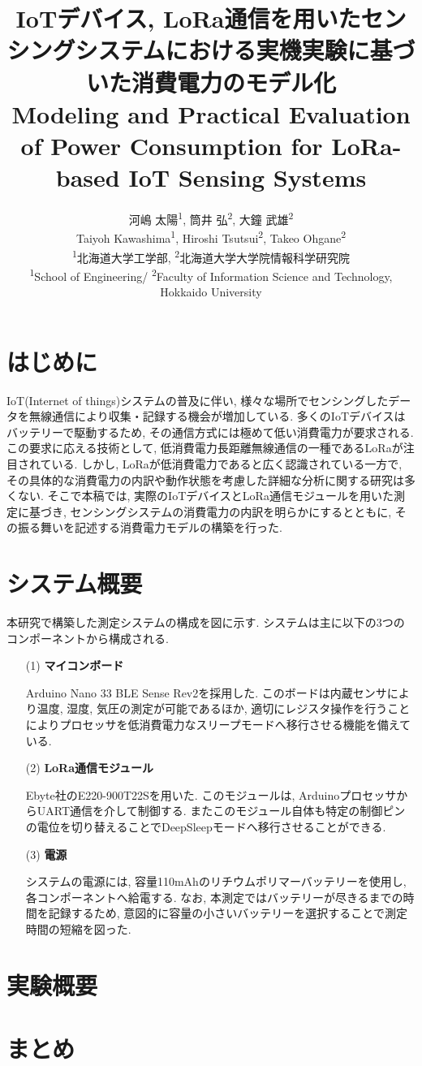 \documentclass[lualatex, twocolumn]{ltjsarticle}
\title{{\bfseries IoTデバイス, LoRa通信を用いたセンシングシステムにおける実機実験に基づいた消費電力のモデル化}\\
\large{Modeling and Practical Evaluation of Power Consumption for LoRa-based IoT Sensing Systems}}
\author{
    河嶋 太陽\textsuperscript{1},
    筒井 弘\textsuperscript{2},
    大鐘 武雄\textsuperscript{2}
    \\
    \normalsize
    Taiyoh Kawashima\textsuperscript{1},
    Hiroshi Tsutsui\textsuperscript{2},
    Takeo Ohgane\textsuperscript{2}
    \\
    \textsuperscript{1}北海道大学工学部,
    \textsuperscript{2}北海道大学大学院情報科学研究院
    \\
    \normalsize
    \textsuperscript{1}School of Engineering/ \textsuperscript{2}Faculty of Information Science and Technology, Hokkaido University
}
\date{}
\begin{document}
\maketitle

\section{はじめに}
 IoT(Internet of things)システムの普及に伴い, 様々な場所でセンシングしたデータを無線通信により収集・記録する機会が増加している. 
多くのIoTデバイスはバッテリーで駆動するため, その通信方式には極めて低い消費電力が要求される. 
この要求に応える技術として,  低消費電力長距離無線通信の一種であるLoRaが注目されている. 
しかし, LoRaが低消費電力であると広く認識されている一方で, その具体的な消費電力の内訳や動作状態を考慮した詳細な分析に関する研究は多くない. 
そこで本稿では,  実際のIoTデバイスとLoRa通信モジュールを用いた測定に基づき, センシングシステムの消費電力の内訳を明らかにするとともに, その振る舞いを記述する消費電力モデルの構築を行った. 

\section{システム概要}
 本研究で構築した測定システムの構成を図に示す. システムは主に以下の3つのコンポーネントから構成される.
\begin{enumerate}
    \item[(1)]\textbf{マイコンボード}

    Arduino Nano 33 BLE Sense Rev2を採用した. このボードは内蔵センサにより温度, 湿度, 気圧の測定が可能であるほか, 
    適切にレジスタ操作を行うことによりプロセッサを低消費電力なスリープモードへ移行させる機能を備えている.

    \item[(2)]\textbf{LoRa通信モジュール}

    Ebyte社のE220-900T22Sを用いた. このモジュールは, ArduinoプロセッサからUART通信を介して制御する. 
    またこのモジュール自体も特定の制御ピンの電位を切り替えることでDeepSleepモードへ移行させることができる. 

    \item[(3)]\textbf{電源}

    システムの電源には, 容量110mAhのリチウムポリマーバッテリーを使用し, 各コンポーネントへ給電する.
    なお, 本測定ではバッテリーが尽きるまでの時間を記録するため, 意図的に容量の小さいバッテリーを選択することで測定時間の短縮を図った.
\end{enumerate}

\section{実験概要}

\section{まとめ}
\end{document}
